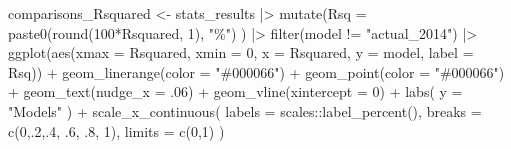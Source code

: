 \documentclass[
]{report}
\newenvironment{Shaded}{\begin{snugshade}}{\end{snugshade}}
\newcommand{\AttributeTok}[1]{\textcolor[rgb]{0.40,0.45,0.13}{#1}}
\newcommand{\DecValTok}[1]{\textcolor[rgb]{0.68,0.00,0.00}{#1}}
\newcommand{\FunctionTok}[1]{\textcolor[rgb]{0.28,0.35,0.67}{#1}}
\newcommand{\NormalTok}[1]{\textcolor[rgb]{0.00,0.23,0.31}{#1}}
\newcommand{\OtherTok}[1]{\textcolor[rgb]{0.00,0.23,0.31}{#1}}
\newcommand{\SpecialCharTok}[1]{\textcolor[rgb]{0.37,0.37,0.37}{#1}}
\newcommand{\StringTok}[1]{\textcolor[rgb]{0.13,0.47,0.30}{#1}}
\begin{document}
\begin{Shaded}
\begin{Highlighting}[]
\NormalTok{comparisons\_Rsquared }\OtherTok{\textless{}{-}}\NormalTok{ stats\_results }\SpecialCharTok{|\textgreater{}} 
  \FunctionTok{mutate}\NormalTok{(}\AttributeTok{Rsq  =} \FunctionTok{paste0}\NormalTok{(}\FunctionTok{round}\NormalTok{(}\DecValTok{100}\SpecialCharTok{*}\NormalTok{Rsquared, }\DecValTok{1}\NormalTok{), }\StringTok{"\%"}\NormalTok{) ) }\SpecialCharTok{|\textgreater{}} 
  \FunctionTok{filter}\NormalTok{(model }\SpecialCharTok{!=} \StringTok{"actual\_2014"}\NormalTok{) }\SpecialCharTok{|\textgreater{}} 
  \FunctionTok{ggplot}\NormalTok{(}\FunctionTok{aes}\NormalTok{(}\AttributeTok{xmax =}\NormalTok{ Rsquared, }\AttributeTok{xmin =} \DecValTok{0}\NormalTok{,}
             \AttributeTok{x =}\NormalTok{ Rsquared, }\AttributeTok{y =}\NormalTok{ model, }\AttributeTok{label =}\NormalTok{ Rsq)) }\SpecialCharTok{+}
  \FunctionTok{geom\_linerange}\NormalTok{(}\AttributeTok{color =} \StringTok{"\#000066"}\NormalTok{) }\SpecialCharTok{+}
  \FunctionTok{geom\_point}\NormalTok{(}\AttributeTok{color =} \StringTok{"\#000066"}\NormalTok{) }\SpecialCharTok{+}
  \FunctionTok{geom\_text}\NormalTok{(}\AttributeTok{nudge\_x =}\NormalTok{ .}\DecValTok{06}\NormalTok{) }\SpecialCharTok{+}
  \FunctionTok{geom\_vline}\NormalTok{(}\AttributeTok{xintercept =} \DecValTok{0}\NormalTok{) }\SpecialCharTok{+}
  \FunctionTok{labs}\NormalTok{(}
    \AttributeTok{y =} \StringTok{"Models"}
\NormalTok{  ) }\SpecialCharTok{+}
  \FunctionTok{scale\_x\_continuous}\NormalTok{(}
    \AttributeTok{labels =}\NormalTok{ scales}\SpecialCharTok{::}\FunctionTok{label\_percent}\NormalTok{(),}
    \AttributeTok{breaks =} \FunctionTok{c}\NormalTok{(}\DecValTok{0}\NormalTok{,.}\DecValTok{2}\NormalTok{,.}\DecValTok{4}\NormalTok{, .}\DecValTok{6}\NormalTok{, .}\DecValTok{8}\NormalTok{, }\DecValTok{1}\NormalTok{), }
    \AttributeTok{limits =} \FunctionTok{c}\NormalTok{(}\DecValTok{0}\NormalTok{,}\DecValTok{1}\NormalTok{)}
\NormalTok{  ) }


\end{Highlighting}
\end{Shaded}
\end{document}
